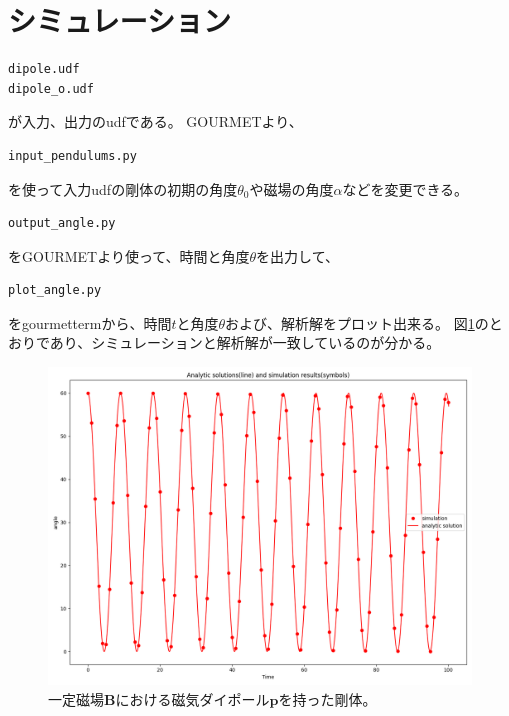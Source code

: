 \documentclass[a4paper,11pt]{jarticle}
\begin{document}
\section{シミュレーション}
\begin{verbatim}
dipole.udf
dipole_o.udf
\end{verbatim}
が入力、出力のudfである。
GOURMETより、
\begin{verbatim}
input_pendulums.py
\end{verbatim}
を使って入力udfの剛体の初期の角度$\theta_0$や磁場の角度$\alpha$などを変更できる。

\begin{verbatim}
output_angle.py
\end{verbatim}
をGOURMETより使って、時間と角度$\theta$を出力して、
\begin{verbatim}
plot_angle.py
\end{verbatim}
をgourmettermから、時間$t$と角度$\theta$および、解析解をプロット出来る。
図\ref{fig:time_angle}のとおりであり、シミュレーションと解析解が一致しているのが分かる。
\begin{figure}[h]
\centering
  \includegraphics[clip,width=0.9\linewidth]{time_angle.png}
  \caption{一定磁場$\bm{B}$における磁気ダイポール$\bm{p}$を持った剛体。
  }
  \label{fig:time_angle}
\end{figure}
\end{document}
